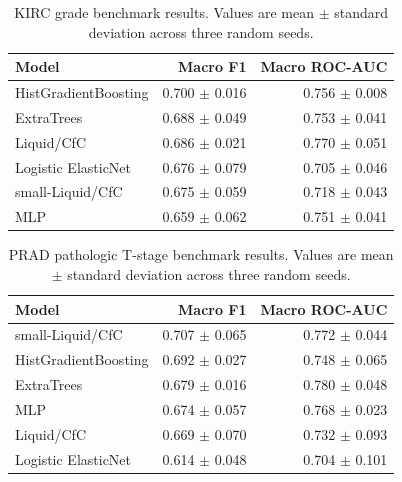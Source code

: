 \begin{table}[ht]
\centering
\caption{KIRC grade benchmark results. Values are mean $\pm$ standard deviation across three random seeds.}
\begin{tabular}{lrr}
\toprule
Model & Macro F1 & Macro ROC-AUC \\
\midrule
HistGradientBoosting & 0.700 $\pm$ 0.016 & 0.756 $\pm$ 0.008 \\
ExtraTrees & 0.688 $\pm$ 0.049 & 0.753 $\pm$ 0.041 \\
Liquid/CfC & 0.686 $\pm$ 0.021 & 0.770 $\pm$ 0.051 \\
Logistic ElasticNet & 0.676 $\pm$ 0.079 & 0.705 $\pm$ 0.046 \\
small-Liquid/CfC & 0.675 $\pm$ 0.059 & 0.718 $\pm$ 0.043 \\
MLP & 0.659 $\pm$ 0.062 & 0.751 $\pm$ 0.041 \\
\bottomrule
\end{tabular}
\label{tab:supp_kirc}
\end{table}

\begin{table}[ht]
\centering
\caption{PRAD pathologic T-stage benchmark results. Values are mean $\pm$ standard deviation across three random seeds.}
\begin{tabular}{lrr}
\toprule
Model & Macro F1 & Macro ROC-AUC \\
\midrule
small-Liquid/CfC & 0.707 $\pm$ 0.065 & 0.772 $\pm$ 0.044 \\
HistGradientBoosting & 0.692 $\pm$ 0.027 & 0.748 $\pm$ 0.065 \\
ExtraTrees & 0.679 $\pm$ 0.016 & 0.780 $\pm$ 0.048 \\
MLP & 0.674 $\pm$ 0.057 & 0.768 $\pm$ 0.023 \\
Liquid/CfC & 0.669 $\pm$ 0.070 & 0.732 $\pm$ 0.093 \\
Logistic ElasticNet & 0.614 $\pm$ 0.048 & 0.704 $\pm$ 0.101 \\
\bottomrule
\end{tabular}
\label{tab:supp_prad}
\end{table}

